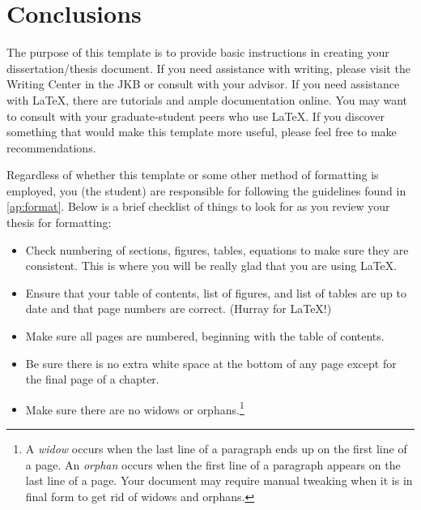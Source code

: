 \chapter{Conclusions}

The purpose of this template is to provide basic instructions in creating your dissertation/thesis document. If you need assistance with writing, please visit the Writing Center in the JKB or consult with your advisor. If you need assistance with \LaTeX, there are tutorials and ample documentation online. You may want to consult with your graduate-student peers who use \LaTeX. If you discover something that would make this template more useful, please feel free to make recommendations.

Regardless of whether this template or some other method of formatting is employed, you (the student) are responsible for following the guidelines found in \cref{ap:format}. Below is a brief checklist of things to look for as you review your thesis for formatting:
\begin{itemize}
	\item Check numbering of sections, figures, tables, equations to make sure they are consistent.	This is where you will be really glad that you are using \LaTeX.
	\item Ensure that your table of contents, list of figures, and list of tables are up to date and that page numbers are correct. (Hurray for \LaTeX!)
	\item Make sure all pages are numbered, beginning with the table of contents.
	\item Be sure there is no extra white space at the bottom of any page except for the final page of a chapter.
	\item Make sure there are no widows or orphans.\footnote{A \emph{widow} occurs when the last line of a paragraph ends up on the first line of a page. An \emph{orphan} occurs when the first line of a paragraph appears on the last line of a page. Your document may require manual tweaking when it is in final form to get rid of widows and orphans.}
\end{itemize}

